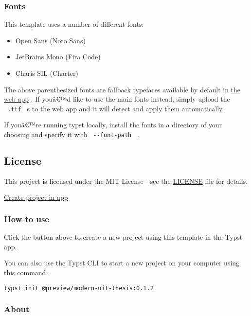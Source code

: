 \subsubsection{Fonts}\label{fonts}

This template uses a number of different fonts:

\begin{itemize}
\tightlist
\item
  Open Sans (Noto Sans)
\item
  JetBrains Mono (Fira Code)
\item
  Charis SIL (Charter)
\end{itemize}

The above parenthesized fonts are fallback typefaces available by
default in \href{https://typst.app/}{the web app} . If youâ€™d like to
use the main fonts instead, simply upload the \texttt{\ .ttf\ } s to the
web app and it will detect and apply them automatically.

If youâ€™re running typst locally, install the fonts in a directory of
your choosing and specify it with \texttt{\ -\/-font-path\ } .

\subsection{License}\label{license}

This project is licensed under the MIT License - see the
\href{https://github.com/typst/packages/raw/main/packages/preview/modern-uit-thesis/0.1.2/LICENSE}{LICENSE}
file for details.

\href{/app?template=modern-uit-thesis&version=0.1.2}{Create project in
app}

\subsubsection{How to use}\label{how-to-use}

Click the button above to create a new project using this template in
the Typst app.

You can also use the Typst CLI to start a new project on your computer
using this command:

\begin{verbatim}
typst init @preview/modern-uit-thesis:0.1.2
\end{verbatim}



\subsubsection{About}\label{about}

